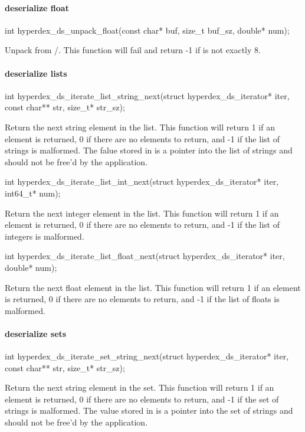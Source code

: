 \paragraph{deserialize float}

\begin{ccode}
int hyperdex_ds_unpack_float(const char* buf, size_t buf_sz, double* num);
\end{ccode}
Unpack  from /.  This function will
fail and return -1 if  is not exactly \unit{8}{\byte}.

\paragraph{deserialize lists}

\begin{ccode}
int hyperdex_ds_iterate_list_string_next(struct hyperdex_ds_iterator* iter,
                                         const char** str, size_t* str_sz);
\end{ccode}
Return the next string element in the list.  This function will return
1 if an element is returned, 0 if there are no elements to return, and -1 if the
list of strings is malformed.  The falue stored in  is a pointer into
the list of strings and should not be free'd by the application.

\begin{ccode}
int hyperdex_ds_iterate_list_int_next(struct hyperdex_ds_iterator* iter, int64_t* num);
\end{ccode}
Return the next integer element in the list.  This function will
return 1 if an element is returned, 0 if there are no elements to return, and -1
if the list of integers is malformed.

\begin{ccode}
int hyperdex_ds_iterate_list_float_next(struct hyperdex_ds_iterator* iter, double* num);
\end{ccode}
Return the next float element in the list.  This function will return
1 if an element is returned, 0 if there are no elements to return, and -1 if the
list of floats is malformed.

\paragraph{deserialize sets}

\begin{ccode}
int hyperdex_ds_iterate_set_string_next(struct hyperdex_ds_iterator* iter,
                                        const char** str, size_t* str_sz);
\end{ccode}
Return the next string element in the set.  This function will return
1 if an element is returned, 0 if there are no elements to return, and -1 if the
set of strings is malformed.  The value stored in  is a pointer into
the set of strings and should not be free'd by the application.

